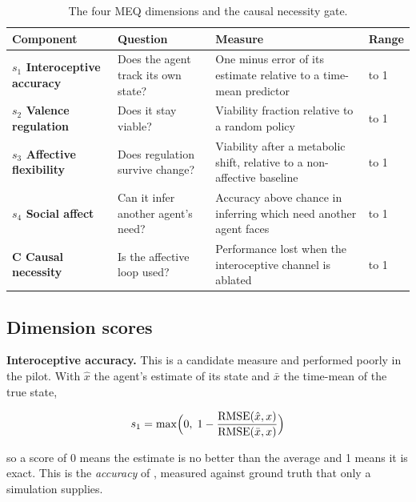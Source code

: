 \documentclass[twoside,11pt]{article}
\begin{document}
\begin{table}[!htbp]
\centering
\caption{The four MEQ dimensions and the causal necessity gate.}\label{tab:3}
\footnotesize
\renewcommand{\arraystretch}{1.2}
\begin{tabular}{>{\raggedright\arraybackslash}p{\dimexpr 0.2105\dimexpr\textwidth-8\tabcolsep\relax\relax}>{\raggedright\arraybackslash}p{\dimexpr 0.2548\dimexpr\textwidth-8\tabcolsep\relax\relax}>{\raggedright\arraybackslash}p{\dimexpr 0.3767\dimexpr\textwidth-8\tabcolsep\relax\relax}>{\raggedright\arraybackslash}p{\dimexpr 0.1580\dimexpr\textwidth-8\tabcolsep\relax\relax}}
\toprule
\textbf{Component} & \textbf{Question} & \textbf{Measure} & \textbf{Range} \\
\midrule
\textbf{$s_{1}$ Interoceptive accuracy} & Does the agent track its own state? & One minus error of its estimate relative to a time-mean predictor & 0 to 1 \\
\textbf{$s_{2}$ Valence regulation} & Does it stay viable? & Viability fraction relative to a random policy & 0 to 1 \\
\textbf{$s_{3}$ Affective flexibility} & Does regulation survive change? & Viability after a metabolic shift, relative to a non-affective baseline & 0 to 1 \\
\textbf{$s_{4}$ Social affect} & Can it infer another agent's need? & Accuracy above chance in inferring which need another agent faces & 0 to 1 \\
\textbf{C Causal necessity} & Is the affective loop used? & Performance lost when the interoceptive channel is ablated & 0 to 1 \\
\bottomrule
\end{tabular}
\end{table}

\subsection{Dimension scores}\label{sec:4.2}

\textbf{Interoceptive accuracy.} This is a candidate measure and performed poorly in the pilot. With $\hat{x}$ the agent's estimate of its state and $\bar{x}$ the time-mean of the true state,

\begin{equation}\label{eq:9}
s_1=\max\Bigl(0,\;1-\frac{\mathrm{RMSE}(\hat{x},x)}{\mathrm{RMSE}(\bar{x},x)}\Bigr)
\end{equation}

\noindent so a score of 0 means the estimate is no better than the average and 1 means it is exact. This is the \emph{accuracy} of \citet{garfinkel2015}, measured against ground truth that only a simulation supplies.
\end{document}
